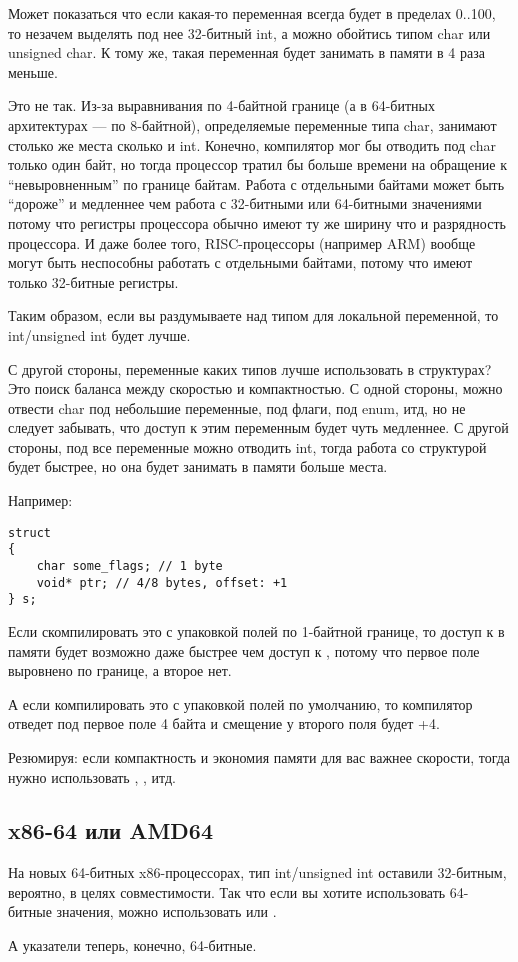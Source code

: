 Может показаться что если какая-то переменная всегда будет в пределах 0..100, то незачем выделять под нее 32-битный
int, а можно обойтись типом char или unsigned char. К тому же, такая переменная будет занимать в памяти в 4 раза меньше.

Это не так. Из-за выравнивания по 4-байтной границе (а в 64-битных архитектурах --- по 8-байтной), 
определяемые переменные типа char, занимают столько же места сколько и int. Конечно, компилятор мог бы отводить под
char только один байт, но тогда процессор тратил бы больше времени на обращение к ``невыровненным'' по границе байтам.
Работа с отдельными байтами может быть ``дороже'' и медленнее чем работа с 32-битными или 64-битными 
значениями потому что
регистры процессора обычно имеют ту же ширину что и разрядность процессора. И даже более того, RISC-процессоры 
(например ARM) вообще могут быть неспособны работать с отдельными байтами, потому что имеют только 32-битные регистры.

Таким образом, если вы раздумываете над типом для локальной переменной, то int/unsigned int будет лучше.

С другой стороны, переменные каких типов лучше использовать в структурах? Это поиск баланса между скоростью
и компактностью. С одной стороны, можно отвести char под небольшие переменные, под флаги, под enum, итд, но не следует
забывать, что доступ к этим переменным будет чуть медленнее. С другой стороны, под все переменные можно отводить
int, тогда работа со структурой будет быстрее, но она будет занимать в памяти больше места.

Например:

\begin{lstlisting}
struct
{
	char some_flags; // 1 byte
	void* ptr; // 4/8 bytes, offset: +1
} s;
\end{lstlisting}

Если скомпилировать это с упаковкой полей по 1-байтной границе, 
то доступ к  в памяти будет возможно даже быстрее чем доступ к , потому что первое поле
выровнено по границе, а второе нет.

А если компилировать это с упаковкой полей по умолчанию, то компилятор отведет под первое поле 4 байта и смещение
у второго поля будет +4.

Резюмируя: если компактность и экономия памяти для вас важнее скорости, тогда нужно использовать 
, , итд.

\subsection{x86-64 или AMD64}

На новых 64-битных x86-процессорах, тип int/unsigned int оставили 32-битным, вероятно, в целях совместимости.
Так что если вы хотите использовать 64-битные значения, можно использовать  или .

А указатели теперь, конечно, 64-битные.
